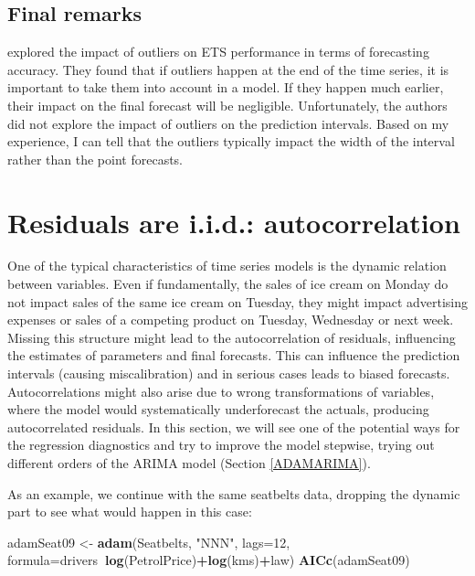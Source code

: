\documentclass[]{book}
\newenvironment{Shaded}{\begin{snugshade}}{\end{snugshade}}
\newcommand{\DataTypeTok}[1]{\textcolor[rgb]{0.13,0.29,0.53}{#1}}
\newcommand{\DecValTok}[1]{\textcolor[rgb]{0.00,0.00,0.81}{#1}}
\newcommand{\KeywordTok}[1]{\textcolor[rgb]{0.13,0.29,0.53}{\textbf{#1}}}
\newcommand{\NormalTok}[1]{#1}
\newcommand{\OperatorTok}[1]{\textcolor[rgb]{0.81,0.36,0.00}{\textbf{#1}}}
\newcommand{\StringTok}[1]{\textcolor[rgb]{0.31,0.60,0.02}{#1}}
\theoremstyle{definition}
\theoremstyle{definition}
\theoremstyle{definition}
\theoremstyle{definition}
\theoremstyle{remark}
\begin{document}
\hypertarget{final-remarks}{%
\subsection{Final remarks}\label{final-remarks}}

\citet{Koehler2012} explored the impact of outliers on ETS performance in terms of forecasting accuracy. They found that if outliers happen at the end of the time series, it is important to take them into account in a model. If they happen much earlier, their impact on the final forecast will be negligible. Unfortunately, the authors did not explore the impact of outliers on the prediction intervals. Based on my experience, I can tell that the outliers typically impact the width of the interval rather than the point forecasts.

\hypertarget{diagnosticsResidualsIIDAuto}{%
\section{Residuals are i.i.d.: autocorrelation}\label{diagnosticsResidualsIIDAuto}}

One of the typical characteristics of time series models is the dynamic relation between variables. Even if fundamentally, the sales of ice cream on Monday do not impact sales of the same ice cream on Tuesday, they might impact advertising expenses or sales of a competing product on Tuesday, Wednesday or next week. Missing this structure might lead to the autocorrelation of residuals, influencing the estimates of parameters and final forecasts. This can influence the prediction intervals (causing miscalibration) and in serious cases leads to biased forecasts. Autocorrelations might also arise due to wrong transformations of variables, where the model would systematically underforecast the actuals, producing autocorrelated residuals. In this section, we will see one of the potential ways for the regression diagnostics and try to improve the model stepwise, trying out different orders of the ARIMA model (Section \ref{ADAMARIMA}).

As an example, we continue with the same seatbelts data, dropping the dynamic part to see what would happen in this case:

\begin{Shaded}
\begin{Highlighting}[]
\NormalTok{adamSeat09 <-}\StringTok{ }\KeywordTok{adam}\NormalTok{(Seatbelts, }\StringTok{"NNN"}\NormalTok{, }\DataTypeTok{lags=}\DecValTok{12}\NormalTok{,}
                   \DataTypeTok{formula=}\NormalTok{drivers}\OperatorTok{~}\KeywordTok{log}\NormalTok{(PetrolPrice)}\OperatorTok{+}\KeywordTok{log}\NormalTok{(kms)}\OperatorTok{+}\NormalTok{law)}
\KeywordTok{AICc}\NormalTok{(adamSeat09)}
\end{Highlighting}
\end{Shaded}
\end{document}
